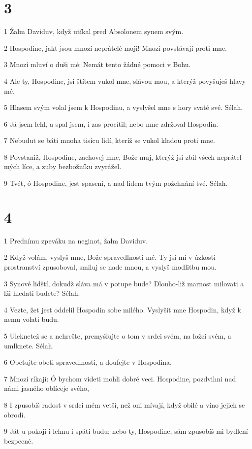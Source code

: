 \chapter{3}

\par 1 Žalm Daviduv, když utíkal pred Absolonem synem svým.
\par 2 Hospodine, jakt jsou mnozí neprátelé moji! Mnozí povstávají proti mne.
\par 3 Mnozí mluví o duši mé: Nemát tento žádné pomoci v Bohu.
\par 4 Ale ty, Hospodine, jsi štítem vukol mne, slávou mou, a kterýž povyšuješ hlavy mé.
\par 5 Hlasem svým volal jsem k Hospodinu, a vyslyšel mne s hory svaté své. Sélah.
\par 6 Já jsem lehl, a spal jsem, i zas procítil; nebo mne zdržoval Hospodin.
\par 7 Nebudut se báti mnoha tisícu lidí, kteríž se vukol kladou proti mne.
\par 8 Povstaniž, Hospodine, zachovej mne, Bože muj, kterýž jsi zbil všech neprátel mých líce, a zuby bezbožníku zvyrážel.
\par 9 Tvét, ó Hospodine, jest spasení, a nad lidem tvým požehnání tvé. Sélah.

\chapter{4}

\par 1 Prednímu zpeváku na neginot, žalm Daviduv.
\par 2 Když volám, vyslyš mne, Bože spravedlnosti mé. Ty jsi mi v úzkosti prostranství zpusoboval, smiluj se nade mnou, a vyslyš modlitbu mou.
\par 3 Synové lidští, dokudž sláva má v potupe bude? Dlouho-liž marnost milovati a lži hledati budete? Sélah.
\par 4 Vezte, žet jest oddelil Hospodin sobe milého. Vyslyšít mne Hospodin, když k nemu volati budu.
\par 5 Uleknetež se a nehrešte, premyšlujte o tom v srdci svém, na ložci svém, a umlknete. Sélah.
\par 6 Obetujte obeti spravedlnosti, a doufejte v Hospodina.
\par 7 Mnozí ríkají: Ó bychom videti mohli dobré veci. Hospodine, pozdvihni nad námi jasného oblíceje svého,
\par 8 I zpusobíš radost v srdci mém vetší, než oni mívají, když obilé a víno jejich se obrodí.
\par 9 Ját u pokoji i lehnu i spáti budu; nebo ty, Hospodine, sám zpusobíš mi bydlení bezpecné.

